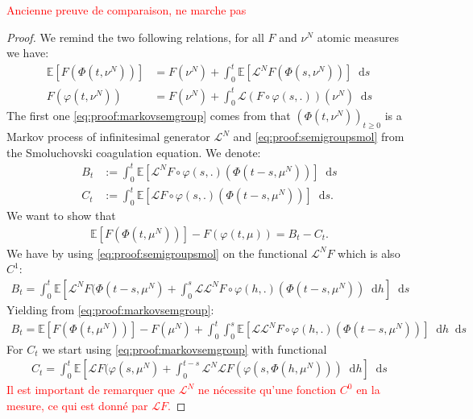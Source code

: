 \documentclass[11pt,a4paper]{article}
\newcommand{\LC}{\mathcal{L}}
\newcommand{\red}[1]{\textcolor{red}{#1}}
\newcommand{\E}[1]{\mathbb{E}\left[#1\right]}
\newcommand{\Proc}[1]{\left(#1\right)_{t\geq 0}}
\newcommand{\dd}{\mathop{}\!\mathrm{d}}
\begin{document}
\red{Ancienne preuve de comparaison, ne marche pas}
\begin{proof}
    We remind the two following relations, for all $F$ and $\nu^N$ atomic measures we have:
    \begin{align}
        \E{F\left(\Phi(t,\nu^N)\right)} &= F(\nu^N) + \int_0^t \E{\LC^N F\left(\Phi(s,\nu^N)\right)}\dd s \label{eq:proof:markovsemgroup} \\
        F\left(\varphi(t,\nu^N)\right) &=  F(\nu^N) + \int_0^t \LC\left( F\circ\varphi(s,.)\right)\left(\nu^N\right)\dd s \label{eq:proof:semigroupsmol}
    \end{align}
    The first one \eqref{eq:proof:markovsemgroup} comes from that $\Proc{\Phi(t,\nu^N)}$ is a Markov process of infinitesimal generator $\LC^N$ and \eqref{eq:proof:semigroupsmol} from the Smoluchovski coagulation equation. We denote:
    \begin{align*}
        B_t &:= \int_0^t \E{\LC^NF\circ\varphi(s,.)\left(\Phi\left(t-s,\mu^N\right)\right)}\dd s\\
        C_t &:= \int_0^t \E{\LC F\circ\varphi(s,.)\left(\Phi\left(t-s,\mu^N\right)\right)}\dd s.
    \end{align*}
    We want to show that 
    \begin{align*}
        \E{F(\Phi(t,\mu^N))} - F(\varphi\left(t,\mu\right)) = B_t - C_t.
    \end{align*}
    We have by using \eqref{eq:proof:semigroupsmol} on the functional $\LC^N F$ which is also $C^1$:
    \begin{align*}
        B_t = \int_0^t \E{\LC^N F(\Phi(t-s,\mu^N) +  \int_0^s \LC
         \LC^N  F\circ \varphi(h,.)\left(\Phi\left(t-s,\mu^N\right)\right)\dd h} \dd s
    \end{align*}
    Yielding from \eqref{eq:proof:markovsemgroup}:
    \begin{align*}
        B_t = \E{F\left(\Phi(t,\mu^N)\right)} - F\left(\mu^N\right) + \int_0^t \int_0^s \E{\LC
         \LC^N  F\circ \varphi(h,.)\left(\Phi\left(t-s,\mu^N\right)\right)}\dd h \dd s
    \end{align*}
    For $C_t$ we start using \eqref{eq:proof:markovsemgroup} with functional 
    \begin{align*}
        C_t = \int_0^t \E{\LC F(\varphi(s,\mu^N) + \int_0^{t-s}\LC^N \LC  F(\varphi(s,\Phi(h,\mu^N)))\dd h} \dd s
    \end{align*}
    \red{Il est important de remarquer que $\LC^N$ ne nécessite qu'une fonction $C^0$ en la mesure, ce qui est donné par $\LC F$.}


\end{proof}
\end{document}
